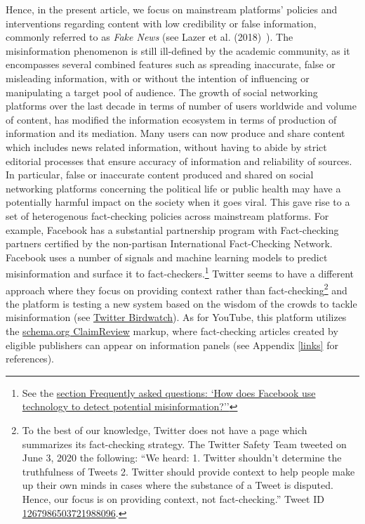 \documentclass{article}
\begin{document}
Hence, in the present article, we focus on mainstream platforms' policies and interventions regarding content with low credibility or false information, commonly referred to as {\it Fake News} (see Lazer et al. (2018)~\cite{lazer}). The misinformation phenomenon is still ill-defined by the academic community, as it encompasses several combined features such as spreading inaccurate, false or misleading information, with or without the intention of influencing or manipulating a target pool of audience.  The growth of social networking platforms over the last decade in terms of number of users worldwide and volume of content, has modified the information ecosystem in terms of production of information and its mediation. Many users can now produce and share content which includes news related information, without having to abide by strict editorial processes that ensure accuracy of information and reliability of sources. In particular, false or inaccurate content produced and shared on social networking platforms concerning the political life or public health may have a potentially harmful impact on the society when it goes viral. This gave rise to a set of heterogenous fact-checking policies across mainstream platforms. For example, Facebook has a substantial partnership program with Fact-checking partners certified by the non-partisan International Fact-Checking Network. Facebook uses a number of signals and machine learning models to predict misinformation and surface it to fact-checkers.\footnote{See the \href{https://www.facebook.com/journalismproject/programs/third-party-fact-checking/how-it-works}{section Frequently asked questions: `How does Facebook use technology to detect potential misinformation?''}} Twitter seems to have a different approach where they focus on providing context rather than fact-checking\footnote{To the best of our knowledge, Twitter does not have a page which summarizes its fact-checking strategy. The Twitter Safety Team tweeted on June 3, 2020 the following:  ``We heard: 1. Twitter shouldn’t determine the truthfulness of Tweets 2. Twitter should provide context to help people make up their own minds in cases where the substance of a Tweet is disputed. Hence, our focus is on providing context, not fact-checking.'' Tweet ID \href{https://twitter.com/TwitterSafety/status/1267986503721988096}{1267986503721988096}.} and the platform is testing a new system based on the wisdom of the crowds to tackle misinformation (see \href{https://blog.twitter.com/en\_us/topics/product/2021/introducing-birdwatch-a-community-based-approach-to-misinformation}{Twitter Birdwatch}). As for YouTube, this platform utilizes the \href{https://schema.org/ClaimReview}{schema.org ClaimReview} markup, where fact-checking articles created by eligible publishers can appear on information panels (see Appendix \ref{links} for references).
\end{document}

